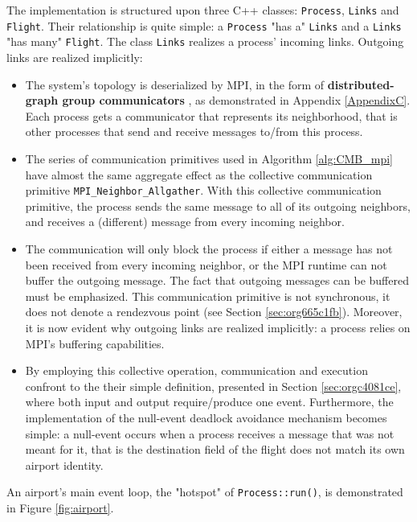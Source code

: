 \documentclass[11pt]{article}
\begin{document}
The implementation is structured upon three C++ classes: \texttt{Process}, \texttt{Links} and \texttt{Flight}. 
Their relationship is quite simple: a \texttt{Process} "has a" \texttt{Links} and a \texttt{Links} "has many" \texttt{Flight}.
The class \texttt{Links} realizes a process' incoming links.
Outgoing links are realized implicitly: 
\begin{itemize}
\item The system's topology is deserialized by MPI, in the form  of \textbf{distributed-graph group communicators} \cite{MessagePassingInterfaceForum2012}, as demonstrated in Appendix \ref{AppendixC}.
Each process gets a communicator that represents its neighborhood, that is other processes that send and receive messages to/from this process.
\item The series of communication primitives used in Algorithm \ref{alg:CMB_mpi} have almost the same aggregate effect as the collective communication primitive \texttt{MPI\_Neighbor\_Allgather}.
With this collective communication primitive, the process sends the same message to all of its outgoing neighbors, and receives a (different) message from every incoming neighbor.
\item The communication will only block the process if either a message has not been received from every incoming neighbor, or the MPI runtime can not buffer the outgoing message.
The fact that outgoing messages can be buffered must be emphasized. 
This communication primitive is not synchronous, it does not denote a rendezvous point (see Section \ref{sec:org665c1fb}).
Moreover, it is now evident why outgoing links are realized implicitly: a process relies on MPI's buffering capabilities.
\item By employing this collective operation, communication and execution confront to the their simple definition, presented in Section \ref{sec:orgc4081ce}, where both input and output require/produce one event.
Furthermore, the implementation of the null-event deadlock avoidance mechanism becomes simple: a null-event occurs when a process receives a message that was not meant for it, that is the destination field of the flight does not match its own airport identity.
\end{itemize}
An airport's main event loop, the "hotspot" of \texttt{Process::run()}, is demonstrated in Figure \ref{fig:airport}.
\end{document}
